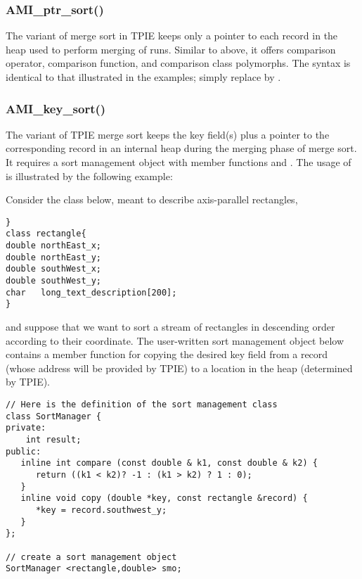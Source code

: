 \subsubsection{AMI\_ptr\_sort()}

The  variant of merge sort in TPIE
keeps only a pointer to each record in the heap used to
perform merging of runs. Similar to 
above, it offers comparison
operator, comparison function, and comparison class
polymorphs. The syntax is identical to that illustrated in
the  examples; simply replace
 by .

\subsubsection{AMI\_key\_sort()}

The  variant of TPIE merge sort keeps
the key field(s) plus a pointer to the corresponding record
in an internal heap during the merging phase of merge sort.
It requires a sort management object with member functions
 and . The usage of
 is illustrated by the following
example:


Consider the class  below, meant to
describe axis-parallel rectangles,

\begin{verbatim}}
class rectangle{
double northEast_x;
double northEast_y;
double southWest_x;
double southWest_y;
char   long_text_description[200];
}
\end{verbatim}

\noindent
and suppose that we want to sort a stream of rectangles in
descending order according to their 
coordinate. The user-written sort management object
 below contains a member function 
for copying the desired key field from a record (whose
address will be provided by TPIE) to a location in the heap
(determined by TPIE). 

\begin{verbatim}
// Here is the definition of the sort management class
class SortManager {
private:
    int result;
public:
   inline int compare (const double & k1, const double & k2) {
      return ((k1 < k2)? -1 : (k1 > k2) ? 1 : 0);
   }
   inline void copy (double *key, const rectangle &record) {
      *key = record.southwest_y;
   }
};

// create a sort management object
SortManager <rectangle,double> smo;
\end{verbatim}
 

